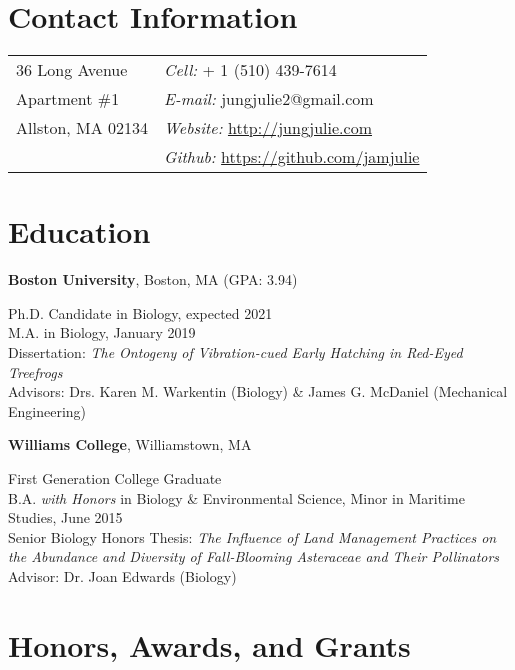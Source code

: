 \documentclass[margin,line]{res}
\begin{document}

\begin{resume}
\section{\sc Contact Information}
\vspace{.05in}
\begin{tabular}{@{}p{2in}p{4in}}
36 Long Avenue & {\it Cell:}  + 1 (510) 439-7614 \\  
Apartment \#1 & {\it E-mail:}  {\ttfamily jungjulie2@gmail.com} \\

Allston, MA 02134 & {\it Website:} \href{http://jungjulie.com}{\ttfamily http://jungjulie.com}\\       
& {\it Github:} \href{https://github.com/jamjulie}{\ttfamily https://github.com/jamjulie}\\     

\end{tabular}

\section{\sc Education}
{\bf Boston University}, Boston, MA (GPA: 3.94)

\vspace*{-4mm}
Ph.D. Candidate in Biology, expected 2021\\
M.A. in Biology, January 2019\\
Dissertation: {\it The Ontogeny of Vibration-cued Early Hatching in Red-Eyed Treefrogs}\\ 
Advisors: Drs. Karen M. Warkentin (Biology) \& James G. McDaniel (Mechanical Engineering)

{\bf Williams College}, Williamstown, MA

\vspace*{-4mm}
First Generation College Graduate \\ 
B.A. {\it with Honors} in Biology \& Environmental Science, Minor in Maritime Studies, June 2015 \\
Senior Biology Honors Thesis: {\it The Influence of Land Management Practices on the Abundance and Diversity of Fall-Blooming Asteraceae and Their Pollinators}\\
Advisor: Dr. Joan Edwards (Biology)

\section{\sc Honors, Awards, and Grants} 


\end{resume}
\end{document}
